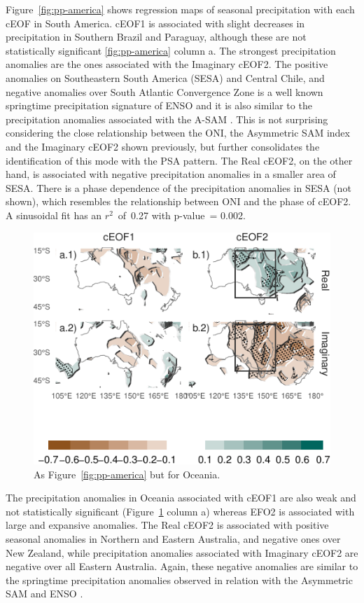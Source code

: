 \documentclass[smallextended]{svjour3}       %
\begin{document}
Figure~\ref{fig:pp-america} shows regression maps of seasonal precipitation with each cEOF in South America. cEOF1 is associated with slight decreases in precipitation in Southern Brazil and Paraguay, although these are not statistically significant \ref{fig:pp-america} column a. The strongest precipitation anomalies are the ones associated with the Imaginary cEOF2. The positive anomalies on Southeastern South America (SESA) and Central Chile, and negative anomalies over South Atlantic Convergence Zone is a well known springtime precipitation signature of ENSO \citep{cai2020a} and it is also similar to the precipitation anomalies associated with the A-SAM \citep{campitelli2021}. This is not surprising considering the close relationship between the ONI, the Asymmetric SAM index and the Imaginary cEOF2 shown previously, but further consolidates the identification of this mode with the PSA pattern. The Real cEOF2, on the other hand, is associated with negative precipitation anomalies in a smaller area of SESA. There is a phase dependence of the precipitation anomalies in SESA (not shown), which resembles the relationship between ONI and the phase of cEOF2. A sinusoidal fit has an \(r^2\)~of~0.27 with p-value~= 0.002.



\begin{figure}
\centering
\includegraphics{../figures/pp-oceania-1.pdf}
\caption{\label{fig:pp-oceania}As Figure~\ref{fig:pp-america} but for Oceania.}
\end{figure}

The precipitation anomalies in Oceania associated with cEOF1 are also weak and not statistically significant (Figure~\ref{fig:pp-oceania} column a) whereas EFO2 is associated with large and expansive anomalies. The Real cEOF2 is associated with positive seasonal anomalies in Northern and Eastern Australia, and negative ones over New Zealand, while precipitation anomalies associated with Imaginary cEOF2 are negative over all Eastern Australia. Again, these negative anomalies are similar to the springtime precipitation anomalies observed in relation with the Asymmetric SAM \citep{campitelli2021} and ENSO \citep{cai2011}.
\end{document}

